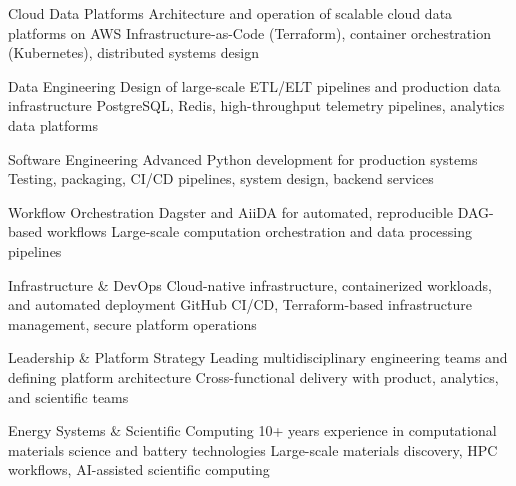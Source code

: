 

\begin{cvskillsnoncentered}

  \cvskill
{Cloud Data Platforms}
{Architecture and operation of scalable cloud data platforms on AWS}
\cvskill
{}
{Infrastructure-as-Code (Terraform), container orchestration (Kubernetes), distributed systems design}

\cvskill
{Data Engineering}
{Design of large-scale ETL/ELT pipelines and production data infrastructure}
\cvskill
{}
{PostgreSQL, Redis, high-throughput telemetry pipelines, analytics data platforms}

\cvskill
{Software Engineering}
{Advanced Python development for production systems}
\cvskill
{}
{Testing, packaging, CI/CD pipelines, system design, backend services}

\cvskill
{Workflow Orchestration}
{Dagster and AiiDA for automated, reproducible DAG-based workflows}
\cvskill
{}
{Large-scale computation orchestration and data processing pipelines}

\cvskill
{Infrastructure \& DevOps}
{Cloud-native infrastructure, containerized workloads, and automated deployment}
\cvskill
{}
{GitHub CI/CD, Terraform-based infrastructure management, secure platform operations}

\cvskill
{Leadership \& Platform Strategy}
{Leading multidisciplinary engineering teams and defining platform architecture}
\cvskill
{}
{Cross-functional delivery with product, analytics, and scientific teams}

\cvskill
{Energy Systems \& Scientific Computing}
{10+ years experience in computational materials science and battery technologies}
\cvskill
{}
{Large-scale materials discovery, HPC workflows, AI-assisted scientific computing}
\end{cvskillsnoncentered}
